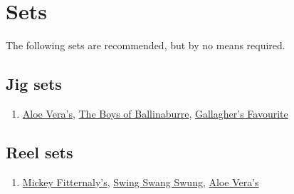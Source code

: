 \documentclass[a4paper,notitlepage,twoside]{book}
\begin{document}

\chapter{Sets}
The following sets are recommended, 
but by no means required.

\section{Jig sets}
\begin{enumerate}
\item \hyperlink{jig:AloeVeras}{Aloe Vera's}, \hyperlink{jig:BoysofBallinaburre}{The Boys of Ballinaburre}, \hyperlink{jig:GallaghersFavourite}{Gallagher's Favourite}
\end{enumerate}

\section{Reel sets}
\begin{enumerate}
\item \hyperlink{reel:MickeyFitternalys}{Mickey Fitternaly's}, \hyperlink{reel:SwingSwangSwung}{Swing Swang Swung}, \hyperlink{reel:AloeVeras}{Aloe Vera's}  
\end{enumerate}


\clearpage
\printindex

\backmatter 

\end{document}
